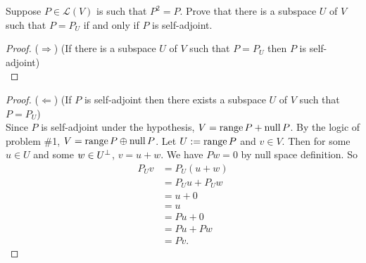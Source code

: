 Suppose $P \in \mathcal{L}(V)$ is such that $P^2 = P$.  Prove that there is a subspace $U$ of $V$ such that $P = P_U$ if and only if $P$ is self-adjoint.
\vspace{0.3in}

\begin{proof} ($\Longrightarrow$) (If there is a subspace $U$ of $V$ such that $P=P_U$ then $P$ is self-adjoint)\\


\end{proof}

\vspace{0.3in}

\begin{proof} ($\Longleftarrow$) (If $P$ is self-adjoint then there exists a subspace $U$ of $V$ such that $P = P_U$)\\
Since $P$ is self-adjoint under the hypothesis, $V = \operatorname{range}{P} + \operatorname{null} P$. By the logic of problem \#1, $V = \operatorname{range}{P} \oplus \operatorname{null} P$. Let $U := \operatorname{range}{P}$ and $v \in V.$ Then for some $u \in U$ and some $w \in {U}^{\perp}$, $v = u +w$. We have $Pw = 0$ by null space definition. So
\begin{align*}
    P_Uv &= P_U(u + w)\\
    &= P_Uu + P_Uw\\
    &= u + 0\\
    &= u\\
    &= Pu + 0\\
    &= Pu + Pw\\
    &= Pv.
\end{align*}
\end{proof}